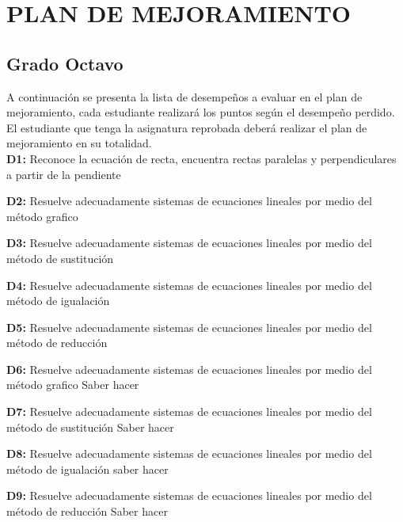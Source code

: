 \documentclass[spanish,12pt,a4paper]{article}
\begin{document}
	\vspace{0.5cm}
	\section*{PLAN DE MEJORAMIENTO}
	\subsection*{Grado Octavo}
	
	A continuación se presenta la lista de desempeños a evaluar en el plan de mejoramiento, cada estudiante realizará los puntos según el desempeño perdido. El estudiante que tenga la asignatura reprobada deberá realizar el plan de mejoramiento en su totalidad.\\
	
	
	\textbf{D1:} Reconoce la ecuación de recta, encuentra rectas paralelas y perpendiculares a partir de la pendiente
	
	\textbf{D2:} Resuelve adecuadamente sistemas de ecuaciones lineales por medio del método grafico
	
	\textbf{D3:} Resuelve adecuadamente sistemas de ecuaciones lineales por medio del método de sustitución
	
	\textbf{D4:} Resuelve adecuadamente sistemas de ecuaciones lineales por medio del método de igualación
	
	\textbf{D5:} Resuelve adecuadamente sistemas de ecuaciones lineales por medio del método de reducción
	
	\textbf{D6:} Resuelve adecuadamente sistemas de ecuaciones lineales por medio del método grafico Saber hacer
	
	\textbf{D7:} Resuelve adecuadamente sistemas de ecuaciones lineales por medio del método de sustitución Saber hacer
	
	\textbf{D8:} Resuelve adecuadamente sistemas de ecuaciones lineales por medio del método de igualación saber hacer
	
	\textbf{D9:} Resuelve adecuadamente sistemas de ecuaciones lineales por medio del método de reducción Saber hacer
	
	
	\vspace{1cm}
	
\end{document}
